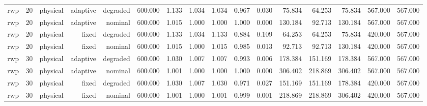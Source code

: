 \begin{tabular}{lrrrrrrrrrrrrrrr}
rwp & 20 & physical & adaptive & degraded & 600.000 & 1.133 & 1.034 & 1.034 & 0.967 & 0.030 & 75.834 & 64.253 & 75.834 & 567.000 & 567.000 \\
rwp & 20 & physical & adaptive & nominal & 600.000 & 1.015 & 1.000 & 1.000 & 1.000 & 0.000 & 130.184 & 92.713 & 130.184 & 567.000 & 567.000 \\
rwp & 20 & physical & fixed & degraded & 600.000 & 1.133 & 1.034 & 1.133 & 0.884 & 0.109 & 64.253 & 64.253 & 75.834 & 420.000 & 567.000 \\
rwp & 20 & physical & fixed & nominal & 600.000 & 1.015 & 1.000 & 1.015 & 0.985 & 0.013 & 92.713 & 92.713 & 130.184 & 420.000 & 567.000 \\
rwp & 30 & physical & adaptive & degraded & 600.000 & 1.030 & 1.007 & 1.007 & 0.993 & 0.006 & 178.384 & 151.169 & 178.384 & 567.000 & 567.000 \\
rwp & 30 & physical & adaptive & nominal & 600.000 & 1.001 & 1.000 & 1.000 & 1.000 & 0.000 & 306.402 & 218.869 & 306.402 & 567.000 & 567.000 \\
rwp & 30 & physical & fixed & degraded & 600.000 & 1.030 & 1.007 & 1.030 & 0.971 & 0.027 & 151.169 & 151.169 & 178.384 & 420.000 & 567.000 \\
rwp & 30 & physical & fixed & nominal & 600.000 & 1.001 & 1.000 & 1.001 & 0.999 & 0.001 & 218.869 & 218.869 & 306.402 & 420.000 & 567.000 \\
\bottomrule
\end{tabular}